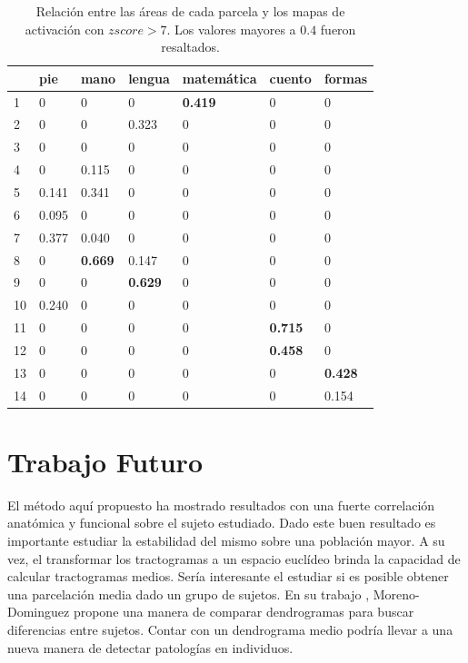 \begin{table}[]
\centering


\label{tb:zscore7}
\begin{tabular}{|l|l|l|l|l|l|l|}
\hline
   & pie   & mano  & lengua & matemática & cuento & formas \\ \hline
1  & 0     & 0     & 0      & {\bf 0.419} & 0     & 0      \\ \hline
2  & 0     & 0     & 0.323  & 0          & 0      & 0      \\ \hline
3  & 0     & 0     & 0      & 0          & 0      & 0      \\ \hline
4  & 0     & 0.115 & 0      & 0          & 0      & 0      \\ \hline
5  & 0.141 & 0.341 & 0      & 0          & 0      & 0      \\ \hline
6  & 0.095 & 0     & 0      & 0          & 0      & 0      \\ \hline
7  & 0.377 & 0.040 & 0      & 0          & 0      & 0      \\ \hline
8  & 0     & {\bf 0.669} & 0.147  & 0          & 0      & 0      \\ \hline
9  & 0     & 0     & {\bf 0.629}  & 0          & 0      & 0      \\ \hline
10 & 0.240 & 0     & 0      & 0          & 0      & 0      \\ \hline
11 & 0     & 0     & 0      & 0          & {\bf 0.715}  & 0      \\ \hline
12 & 0     & 0     & 0      & 0          & {\bf 0.458}  & 0      \\ \hline
13 & 0     & 0     & 0      & 0          & 0      & {\bf 0.428}  \\ \hline
14 & 0     & 0     & 0      & 0          & 0      & 0.154 \\ \hline
\end{tabular}

\caption{Relaci\'on entre las \'areas de cada parcela y los mapas de
         activaci\'on con $zscore > 7$. Los valores mayores a $0.4$ fueron
         resaltados.}

\end{table}


\section{Trabajo Futuro}
El m\'etodo aqu\'i propuesto ha mostrado resultados con una fuerte correlaci\'on
anat\'omica y funcional sobre el sujeto estudiado. Dado este buen resultado es 
importante estudiar la estabilidad del mismo sobre una poblaci\'on mayor.
A su vez, el transformar los tractogramas a un espacio eucl\'ideo brinda la 
capacidad de calcular tractogramas medios. Ser\'ia interesante el estudiar
si es posible obtener una parcelaci\'on media dado un grupo de sujetos. 
En su trabajo \cite{Moreno-Dominguez2014}, Moreno-Dominguez propone una manera
de comparar dendrogramas para buscar diferencias entre sujetos. Contar con un
dendrograma medio podr\'ia llevar a una nueva manera de detectar patolog\'ias
en individuos.

